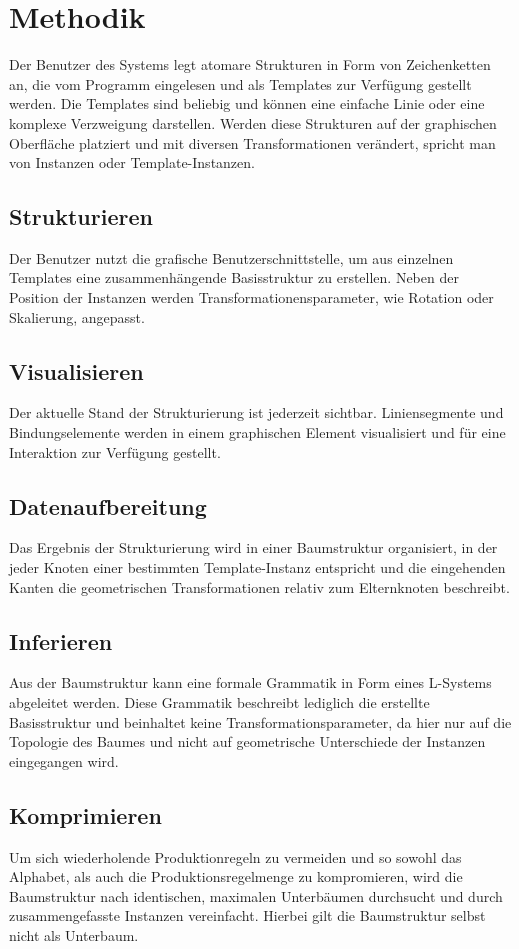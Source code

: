\section{Methodik}
Der Benutzer des Systems legt atomare Strukturen in Form von Zeichenketten an, die vom Programm eingelesen und
als Templates zur Verfügung gestellt werden.
Die Templates sind beliebig und können eine einfache Linie oder eine komplexe Verzweigung darstellen.
Werden diese Strukturen auf der graphischen Oberfläche platziert und mit diversen Transformationen verändert, spricht man
von Instanzen oder Template-Instanzen.

\subsection*{Strukturieren}
Der Benutzer nutzt die grafische Benutzerschnittstelle, um aus einzelnen Templates eine zusammenhängende Basisstruktur zu
erstellen.
Neben der Position der Instanzen werden Transformationensparameter, wie Rotation oder Skalierung, angepasst.

\subsection*{Visualisieren}
Der aktuelle Stand der Strukturierung ist jederzeit sichtbar.
Liniensegmente und Bindungselemente werden in einem graphischen Element visualisiert und für eine Interaktion zur Verfügung
gestellt.

\subsection*{Datenaufbereitung}
Das Ergebnis der Strukturierung wird in einer Baumstruktur
organisiert, in der jeder Knoten einer bestimmten Template-Instanz entspricht und die eingehenden Kanten die
geometrischen Transformationen relativ zum Elternknoten beschreibt.

\subsection*{Inferieren}
Aus der Baumstruktur kann eine formale Grammatik in Form eines L-Systems abgeleitet werden.
Diese Grammatik beschreibt lediglich die erstellte Basisstruktur und beinhaltet keine Transformationsparameter, da hier
nur auf die Topologie des Baumes und nicht auf geometrische Unterschiede der Instanzen eingegangen wird.

\subsection*{Komprimieren}
Um sich wiederholende Produktionregeln zu vermeiden und so sowohl das Alphabet, als auch die Produktionsregelmenge
zu kompromieren, wird die Baumstruktur nach identischen, maximalen Unterbäumen durchsucht und durch zusammengefasste
Instanzen vereinfacht.
Hierbei gilt die Baumstruktur selbst nicht als Unterbaum.

